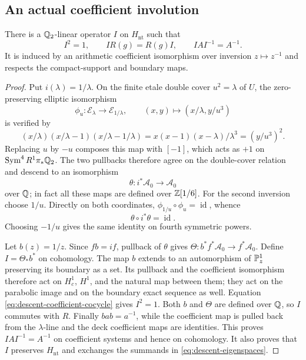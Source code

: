 \subsection{An actual coefficient involution}

\begin{lemma}\label{lem:descent-involution}
There is a $\mathbb Q_2$-linear operator $I$ on $H_{\mathrm{nt}}$ such that
\[
 I^2=1,\qquad IR(g)=R(g)I,\qquad IAI^{-1}=A^{-1}.
\]
It is induced by an arithmetic coefficient isomorphism over inversion
$z\mapsto z^{-1}$ and respects the compact-support and boundary maps.
\end{lemma}

\begin{proof}
Put $i(\lambda)=1/\lambda$. On the finite etale double cover
$u^2=\lambda$ of $U$, the zero-preserving elliptic isomorphism
\begin{equation}\label{eq:descent-elliptic-map}
 \phi_u:\mathcal E_\lambda\longrightarrow\mathcal E_{1/\lambda},
 \qquad (x,y)\longmapsto(x/\lambda,y/u^3)
\end{equation}
is verified by
\[
 (x/\lambda)(x/\lambda-1)(x/\lambda-1/\lambda)
   =x(x-1)(x-\lambda)/\lambda^3=(y/u^3)^2.
\]
Replacing $u$ by $-u$ composes this map with $[-1]$, which acts as
$+1$ on $\operatorname{Sym}^4R^1\pi_*\mathbb Q_2$. The two pullbacks therefore agree
on the double-cover relation and descend to an isomorphism
\[
 \theta:i^*\mathcal A_0\longrightarrow\mathcal A_0
\]
over $\mathbb Q$; in fact all these maps are defined over $\mathbb Z[1/6]$.
For the second inversion choose $1/u$. Directly on both coordinates,
$\phi_{1/u}\circ\phi_u=\operatorname{id}$, whence
\begin{equation}\label{eq:descent-coefficient-cocycle}
 \theta\circ i^*\theta=\operatorname{id}.
\end{equation}
Choosing $-1/u$ gives the same identity on fourth symmetric powers.

Let $b(z)=1/z$. Since $fb=if$, pullback of $\theta$ gives
$\Theta:b^*f^*\mathcal A_0\to f^*\mathcal A_0$.
Define $I=\Theta_*b^*$ on cohomology. The map $b$ extends to an
automorphism of $\mathbb P^1_z$ preserving its boundary as a set. Its
pullback and the coefficient isomorphism therefore act on $H_c^1$,
$H^1$, and the natural map between them; they act on the parabolic
image and on the boundary exact sequence as well. Equation
\eqref{eq:descent-coefficient-cocycle} gives $I^2=1$.
Both $b$ and $\Theta$ are defined over $\mathbb Q$, so $I$ commutes with $R$.
Finally $bab=a^{-1}$, while the coefficient map is pulled back from
the $\lambda$-line and the deck coefficient maps are identities.
This proves $IAI^{-1}=A^{-1}$ on coefficient systems and hence on
cohomology. It also proves that $I$ preserves $H_{\mathrm{nt}}$ and
exchanges the summands in \eqref{eq:descent-eigenspaces}.
\end{proof}

